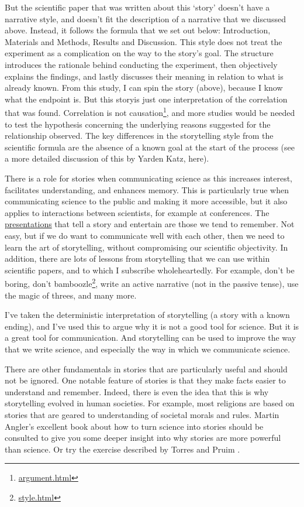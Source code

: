\documentclass[
]{krantz}
\renewcommand{\href}[2]{#2\footnote{\url{#1}}}
\begin{document}
But the scientific paper that was written about this `story' \citep{becker2018extreme} doesn't have a narrative style, and doesn't fit the description of a narrative that we discussed above. Instead, it follows the formula that we set out below: Introduction, Materials and Methods, Results and Discussion. This style does not treat the experiment as a complication on the way to the story's goal. The structure introduces the rationale behind conducting the experiment, then objectively explains the findings, and lastly discusses their meaning in relation to what is already known. From this study, I can spin the story (above), because I know what the endpoint is. But this storyis just one interpretation of the correlation that was found. \href{argument.html}{Correlation is not causation}, and more studies would be needed to test the hypothesis concerning the underlying reasons suggested for the relationship observed. The key differences in the storytelling style from the scientific formula are the absence of a known goal at the start of the process (see a more detailed discussion of this by Yarden Katz, \citeyearpar{katz2013storytelling} here).

There is a role for stories when communicating science as this increases interest, facilitates understanding, and enhances memory. This is particularly true when communicating science to the public and making it more accessible, but it also applies to interactions between scientists, for example at conferences. The \protect\hyperlink{proposal-presentation.html}{presentations} that tell a story and entertain are those we tend to remember. Not easy, but if we do want to communicate well with each other, then we need to learn the art of storytelling, without compromising our scientific objectivity. In addition, there are lots of lessons from storytelling that we can use within scientific papers, and to which I subscribe wholeheartedly. For example, don't be boring, don't \href{style.html}{bamboozle}, write an active narrative (not in the passive tense), use the magic of threes, and many more.

I've taken the deterministic interpretation of storytelling (a story with a known ending), and I've used this to argue why it is not a good tool for science. But it is a great tool for communication. And storytelling can be used to improve the way that we write science, and especially the way in which we communicate science.

There are other fundamentals in stories that are particularly useful and should not be ignored. One notable feature of stories is that they make facts easier to understand and remember. Indeed, there is even the idea that this is why storytelling evolved in human societies. For example, most religions are based on stories that are geared to understanding of societal morals and rules. Martin Angler's \citeyearpar{angler2020telling} excellent book about how to turn science into stories should be consulted to give you some deeper insight into why stories are more powerful than science. Or try the exercise described by Torres and Pruim \citeyearpar{torres2019scientific}.
\end{document}
